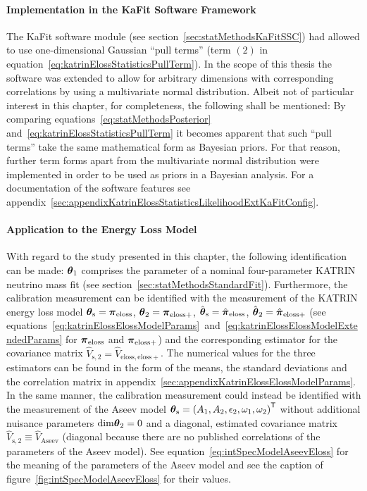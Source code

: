 \paragraph{Implementation in the KaFit Software Framework}
The KaFit software module (see section~\ref{sec:statMethodsKaFitSSC}) had allowed to use one-dimensional Gaussian ``pull terms'' (term $(2)$ in equation~\ref{eq:katrinElossStatisticsPullTerm}). In the scope of this thesis the software was extended to allow for arbitrary dimensions with corresponding correlations by using a multivariate normal distribution. Albeit not of particular interest in this chapter, for completeness, the following shall be mentioned: By comparing equations~\eqref{eq:statMethodsPosterior} and~\eqref{eq:katrinElossStatisticsPullTerm} it becomes apparent that such ``pull terms'' take the same mathematical form as Bayesian priors. For that reason, further term forms apart from the multivariate normal distribution were implemented in order to be used as priors in a Bayesian analysis. For a documentation of the software features see appendix~\ref{sec:appendixKatrinElossStatisticsLikelihoodExtKaFitConfig}.

\paragraph{Application to the Energy Loss Model}
With regard to the study presented in this chapter, the following identification can be made: $\boldsymbol{\mathbf{\theta}}_1$ comprises the parameter of a nominal four-parameter KATRIN neutrino mass fit (see section~\ref{sec:statMethodsStandardFit}). Furthermore, the calibration measurement can be identified with the measurement of the KATRIN energy loss model $\boldsymbol{\mathbf{\theta}}_\mathrm{s}=\boldsymbol{\mathbf{\pi}}_\mathrm{eloss}$, $\boldsymbol{\mathbf{\theta}}_2=\boldsymbol{\mathbf{\pi}}_\mathrm{eloss+}$, $\hat{\boldsymbol{\mathbf{\theta}}}_\mathrm{s}=\hat{\boldsymbol{\mathbf{\pi}}}_\mathrm{eloss}$, $\hat{\boldsymbol{\mathbf{\theta}}}_2=\hat{\boldsymbol{\mathbf{\pi}}}_\mathrm{eloss+}$ (see equations~\ref{eq:katrinElossElossModelParams}~and~\ref{eq:katrinElossElossModelExtendedParams} for $\boldsymbol{\mathbf{\pi}}_\mathrm{eloss}$ and $\boldsymbol{\mathbf{\pi}}_\mathrm{eloss+}$) and the corresponding estimator for the covariance matrix $\hat{V}_\mathrm{s,2}=\hat{V}_\mathrm{eloss,eloss+}$. The numerical values for the three estimators can be found in the form of the means, the standard deviations and the correlation matrix in appendix~\ref{sec:appendixKatrinElossElossModelParams}. In the same manner, the calibration measurement could instead be identified with the measurement of the Aseev model $\boldsymbol{\mathbf{\theta}}_\mathrm{s}={(A_1, A_2,\epsilon_2,\omega_1,\omega_2)}^{\mathsf{T}}$ without additional nuisance parameters $\mathrm{dim}\boldsymbol{\mathbf{\theta}}_2=0$ and a diagonal, estimated covariance matrix $\hat{V}_\mathrm{s,2}\equiv\hat{V}_\mathrm{Aseev}$ (diagonal because there are no published correlations of the parameters of the Aseev model). See equation~\eqref{eq:intSpecModelAseevEloss} for the meaning  of the parameters of the Aseev model and see the caption of figure~\ref{fig:intSpecModelAseevEloss} for their values.

